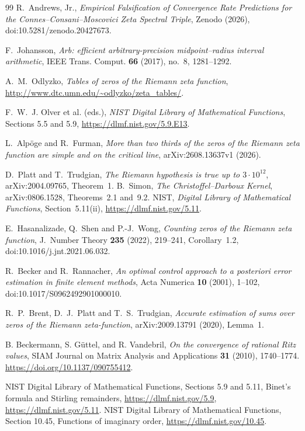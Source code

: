 \documentclass[11pt,a4paper]{article}
\begin{document}
\begin{thebibliography}{99}
R.~Andrews, Jr.,
\emph{Empirical Falsification of Convergence Rate Predictions for the
Connes--Consani--Moscovici Zeta Spectral Triple}, Zenodo (2026),
doi:10.5281/zenodo.20427673.

F.~Johansson,
\emph{Arb: efficient arbitrary-precision midpoint--radius interval arithmetic},
IEEE Trans. Comput. \textbf{66} (2017), no.~8, 1281--1292.

A.~M.~Odlyzko,
\emph{Tables of zeros of the Riemann zeta function},
\url{http://www.dtc.umn.edu/~odlyzko/zeta_tables/}.

F.~W.~J. Olver et al. (eds.),
\emph{NIST Digital Library of Mathematical Functions},
Sections 5.5 and 5.9, \url{https://dlmf.nist.gov/5.9.E13}.

L.~Alp\"oge and R.~Furman,
\emph{More than two thirds of the zeros of the Riemann zeta function are simple
and on the critical line}, arXiv:2608.13637v1 (2026).


D.~Platt and T.~Trudgian, \emph{The Riemann hypothesis is true up to
$3\cdot10^{12}$}, arXiv:2004.09765, Theorem~1.
B.~Simon, \emph{The Christoffel--Darboux Kernel}, arXiv:0806.1528,
Theorems~2.1 and~9.2.
NIST, \emph{Digital Library of Mathematical Functions}, Section~5.11(ii),
\url{https://dlmf.nist.gov/5.11}.


E.~Hasanalizade, Q.~Shen and P.-J.~Wong, \emph{Counting zeros of the Riemann
zeta function}, J.~Number Theory \textbf{235} (2022), 219--241,
Corollary~1.2, doi:10.1016/j.jnt.2021.06.032.

R.~Becker and R.~Rannacher,
\emph{An optimal control approach to a posteriori error estimation in
finite element methods}, Acta Numerica \textbf{10} (2001), 1--102,
doi:10.1017/S0962492901000010.

R.~P.~Brent, D.~J.~Platt and T.~S.~Trudgian,
\emph{Accurate estimation of sums over zeros of the Riemann zeta-function},
arXiv:2009.13791 (2020), Lemma~1.

B. Beckermann, S. G\"uttel, and R. Vandebril,
\emph{On the convergence of rational Ritz values},
SIAM Journal on Matrix Analysis and Applications \textbf{31} (2010), 1740--1774.
\url{https://doi.org/10.1137/090755412}.

NIST Digital Library of Mathematical Functions,
Sections 5.9 and 5.11, Binet's formula and Stirling remainders,
\url{https://dlmf.nist.gov/5.9}, \url{https://dlmf.nist.gov/5.11}.
NIST Digital Library of Mathematical Functions,
Section 10.45, Functions of imaginary order,
\url{https://dlmf.nist.gov/10.45}.

\end{thebibliography}
\end{document}
